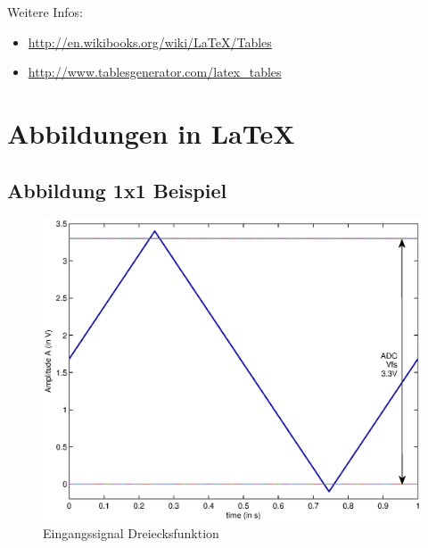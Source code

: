 \documentclass[SSS_Laborbericht.tex]{subfiles}
\begin{document}
Weitere Infos:
\begin{itemize}
  \item \href{http://en.wikibooks.org/wiki/LaTeX/Tables}{http://en.wikibooks.org/wiki/LaTeX/Tables}
  \item \href{http://www.tablesgenerator.com/latex\_tables}{http://www.tablesgenerator.com/latex\_tables}
\end{itemize}

\newpage

\section{Abbildungen in \LaTeX}

\subsection{Abbildung 1x1 Beispiel}
\begin{figure}[H]
	\centering\small
	\includegraphics[width=\textwidth]{media/matlab/HISTOGRAM/ramp_fkt_samples_5000.eps}
	\caption{Eingangssignal Dreiecksfunktion}
	\label{fig:GRUNDL_RAMP_SIN_HIST_1X1}
\end{figure}
~
\end{document}
